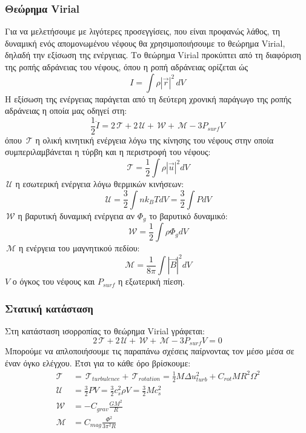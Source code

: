 \documentclass[a4paper,12pt]{memoir}
\newcommand{\TT}{\,\mathcal{T}}
\newcommand{\UU}{\,\mathcal{U}}
\newcommand{\WW}{\,\mathcal{W}}
\newcommand{\MM}{\,\mathcal{M}}
\begin{document}
\subsubsection{Θεώρημα Virial}
Για να μελετήσουμε με λιγότερες προσεγγίσεις, που είναι προφανώς λάθος, τη δυναμική ενός απομονωμένου νέφους θα χρησιμοποιήσουμε το θεώρημα Virial, δηλαδή την εξίσωση της ενέργειας.
Το θεώρημα Virial προκύπτει από τη διαφόριση της ροπής αδράνειας του νέφους, όπου η ροπή αδράνειας ορίζεται ώς 
\begin{equation}
I=\int \rho |\vec{r}|^2 \, dV
\end{equation}
Η εξίσωση της ενέργειας παράγεται από τη δεύτερη χρονική παράγωγο της ροπής αδράνειας η οποία μας οδηγεί στη:
\begin{equation}
\frac{1}{2}\ddot{I}=2\TT+2\UU +\WW+\MM -3P_{surf}V
\end{equation}
όπου $\TT$ η ολική κινητική ενέργεια λόγω της κίνησης του νέφους στην οποία συμπεριλαμβάνεται η τύρβη και η περιστροφή του νέφους:
\begin{equation}
\TT = \frac{1}{2} \int \rho |\vec{u}|^2 dV
\end{equation}
$\UU$ η εσωτερική ενέργεια λόγω θερμικών κινήσεων:
\begin{equation}
\UU=\frac{3}{2} \int n k_B T dV=\frac{3}{2} \int P dV
\end{equation}
$\WW$ η βαρυτική δυναμική ενέργεια αν $\Phi _g$ το βαρυτικό δυναμικό:
\begin{equation}
\WW=\frac{1}{2} \int \rho \Phi _g dV
\end{equation}
$\MM$ η ενέργεια του μαγνητικού πεδίου:
\begin{equation}
\MM=\frac{1}{8\pi} \int |\vec{B}|^2 dV
\end{equation}
$V$ ο όγκος του νέφους και $P_{surf}$ η εξωτερική πίεση. 
\subsubsection{Στατική κατάσταση}
Στη κατάσταση ισορροπίας το θεώρημα Virial γράφεται:
\begin{equation}
\label{eq:Virial}
2\TT+2\UU +\WW+\MM -3P_{surf}V=0
\end{equation}
Μπορούμε να απλοποιήσουμε τις παραπάνω σχέσεις παίρνοντας τον μέσο μέσα σε έναν όγκο ελέγχου. Έτσι για το κάθε όρο βρίσκουμε:
\begin{align}
\TT &= \TT_{turbulence}+\TT_{rotation} = \frac{1}{2} M \Delta u_{turb} ^2 + C_{rot} M R^2 \Omega ^2\\
\UU &= \frac{3}{2} P V=\frac{3}{2} c_s ^2 \rho V=\frac{3}{2} M c_s ^2 \\
\WW &= -C_{grav} \frac{GM^2}{R} \\
\MM & = C_{mag}\frac{\Phi^2}{3 \pi ^2 R}
\end{align}
\noindent
\end{document}
